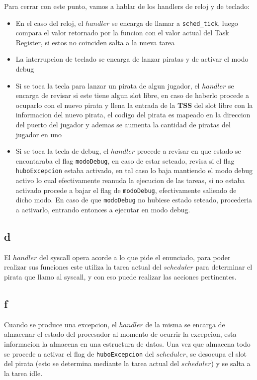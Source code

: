 Para cerrar con este punto, vamos a hablar de los handlers de reloj y de teclado:

\begin{itemize}
	\item En el caso del reloj, el $handler$ se encarga de llamar a \texttt{sched\_tick}, luego compara el valor retornado por la funcion con el valor actual del Task Register, si estos no coinciden salta a la nueva tarea
	\item La interrupcion de teclado se encarga de lanzar piratas y de activar el modo debug
	\item Si se toca la tecla para lanzar un pirata de algun jugador, el $handler$ se encarga de revisar si este tiene algun slot libre, en caso de haberlo procede a ocuparlo con el nuevo pirata y llena la entrada de la \textbf{TSS} del slot libre con la informacion del nuevo pirata, el codigo del pirata es mapeado en la direccion del puerto del jugador y ademas se aumenta la cantidad de piratas del jugador en uno
	\item Si se toca la tecla de debug, el $handler$ procede a revisar en que estado se encontaraba el flag \texttt{modoDebug}, en caso de estar seteado, revisa si el flag \texttt{huboExcepcion} estaba activado, en tal caso lo baja mantiendo el modo debug activo lo cual efectivamente reanuda la ejecucion de las tareas, si no estaba activado procede a bajar el flag de \texttt{modoDebug}, efectivamente saliendo de dicho modo. En caso de que \texttt{modoDebug} no hubiese estado seteado, procederia a activarlo, entrando entonces a ejecutar en modo debug.
\end{itemize}
	
\subsection{d}

El $handler$ del syscall opera acorde a lo que pide el enunciado, para poder realizar sus funciones este utiliza la tarea actual del $scheduler$ para determinar el pirata que llamo al syscall, y con eso puede realizar las acciones pertinentes.

\subsection{f}

Cuando se produce una excepcion, el $handler$ de la misma se encarga de almacenar el estado del procesador al momento de ocurrir la excepcion, esta informacion la almacena en una estructura de datos. Una vez que almacena todo se procede a activar el flag de \texttt{huboExcepcion} del $scheduler$, se desocupa el slot del pirata (esto se determina mediante la tarea actual del $scheduler$) y se salta a la tarea idle.